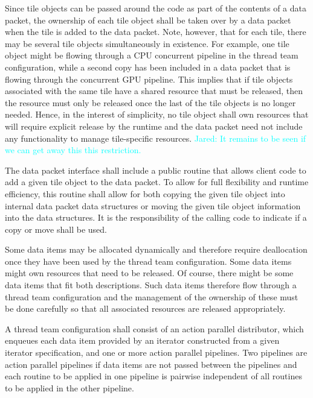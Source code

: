 \documentclass{article}
\newcommand{\Jared}[1]          {\textcolor{cyan}{Jared: #1}}
\begin{document}
\begin{spec}
Since tile objects can be passed around the code as part of the contents of a
data packet, the ownership of each tile object shall be taken over by a data
packet when the tile is added to the data packet.  Note, however, that for each
tile, there may be several tile objects simultaneously in existence.  For
example, one tile object might be flowing through a CPU concurrent pipeline in
the thread team configuration, while a second copy has been included in a data
packet that is flowing through the concurrent GPU pipeline.  This implies that
if tile objects associated with the same tile have a shared resource that must
be released, then the resource must only be released once the last of the tile
objects is no longer needed.  Hence, in the interest of simplicity, no tile
object shall own resources that will require explicit release by the runtime and
the data packet need not include any functionality to manage tile-specific
resources.  \Jared{It remains to be seen if we can get away this this
restriction.}
\end{spec}

\begin{spec}
The data packet interface shall include a public routine that allows client code
to add a given tile object to the data packet.  To allow for full flexibility
and runtime efficiency, this routine shall allow for both copying the given tile
object into internal data packet data structures or moving the given tile object
information into the data structures.  It is the responsibility of the calling
code to indicate if a copy or move shall be used.
\end{spec}

Some data items may be allocated dynamically and therefore require deallocation
once they have been used by the thread team configuration.  Some data items
might own resources that need to be released.  Of course, there might be some
data items that fit both descriptions.  Such data items therefore flow through
a thread team configuration and the management of the ownership of these must be
done carefully so that all associated resources are released appropriately.

\begin{spec}
A thread team configuration shall consist of an action parallel distributor,
which enqueues each data item provided by an iterator constructed from a given
iterator specification, and one or more action parallel pipelines.  Two
pipelines are action parallel pipelines if data items are not passed between the
pipelines and each routine to be applied in one pipeline is pairwise independent
of all routines to be applied in the other pipeline.
\end{spec}
\end{document}
